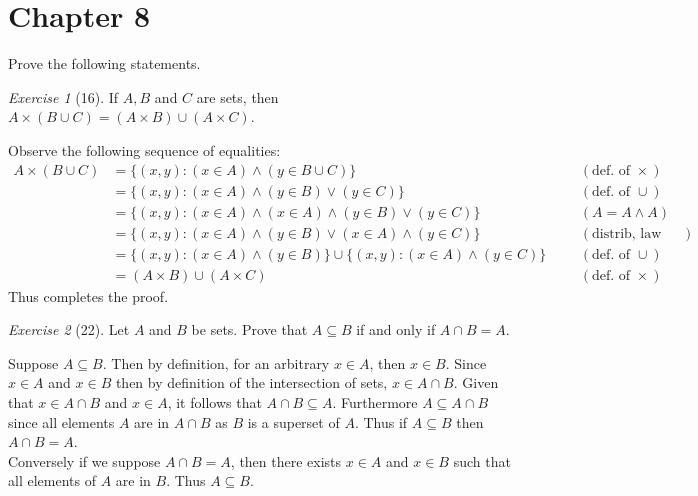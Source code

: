 \documentclass[12pt]{amsart}
\makeatletter
\theoremstyle{remark}
\newtheorem*{exercise}{Exercise}%
\renewenvironment{proof}[1][\proofname]{\par\doublespacing
  \pushQED{\qed}%
  \normalfont \topsep6\p@\@plus6\p@\relax
  \list{}{%
    \settowidth{\leftmargin}{\itshape\proofname:\hskip\labelsep}%
    \setlength{\labelwidth}{0pt}%
    \setlength{\itemindent}{-\leftmargin}%
  }%
  \item[\hskip\labelsep\itshape#1\@addpunct{:}]\ignorespaces
}{%
  \popQED\endlist\@endpefalse
  \singlespacing
}
\theoremstyle{mycomment}
\makeatother
\begin{document}
\thispagestyle{fancy}

\section*{Chapter 8} Prove the following statements.
\begin{exercise}[16] If $A,B$ and $C$ are sets, then $A\times (B\cup C)=(A\times B)\cup (A\times C)$.
\begin{proof} Observe the following sequence of equalities:
  \begin{align*}
    A \times (B \cup C) & = \{(x,y):(x \in A) \land (y \in B \cup C)\} &&& (\text{def. of } \times)  \\
                        & = \{(x,y):(x \in A) \land (y \in B) \lor (y \in C)\} &&& (\text{def. of } \cup)\\
                        & = \{(x,y):(x \in A) \land (x \in A) \land ( y \in B) \lor (y \in C)\} &&& (A = A \land A) \\
                        & = \{(x,y):(x \in A) \land (y \in B) \lor (x \in A) \land (y \in C)\} &&&  (\text{distrib, law for sets})\\ %
                        & = \{(x,y):(x \in A) \land (y  \in B)\} \cup \{(x,y): (x \in A) \land (y \in C)\} &&& (\text{def. of } \cup)\\
                        & = (A \times B) \cup (A \times C) &&& (\text{def. of } \times)
  \end{align*}
  Thus completes the proof.
\end{proof}
\end{exercise}
\begin{exercise}[22] Let $A$ and $B$ be sets. Prove that $A\subseteq B$ if and only if $A\cap B=A$.
\begin{proof}%
Suppose $A \subseteq B$. Then by definition, for an arbitrary $x \in A$, then $x \in B$. Since $x \in A$ and $x \in B$ then by definition of the intersection of sets, $x \in A \cap B$. Given that $x \in A \cap B$ and $x \in A$, it follows that $A \cap B \subseteq A$. Furthermore $A \subseteq A \cap B$ since all elements $A$ are in $A \cap B$ as $B$ is a superset of $A$. Thus if $A \subseteq B$ then $A \cap B = A$. \\
Conversely if we suppose $A \cap B = A$, then there exists $x \in A$ and $x \in B$ such that all elements of $A$ are in $B$. Thus $ A \subseteq B$. 
\end{proof}
\end{exercise}
\end{document}
